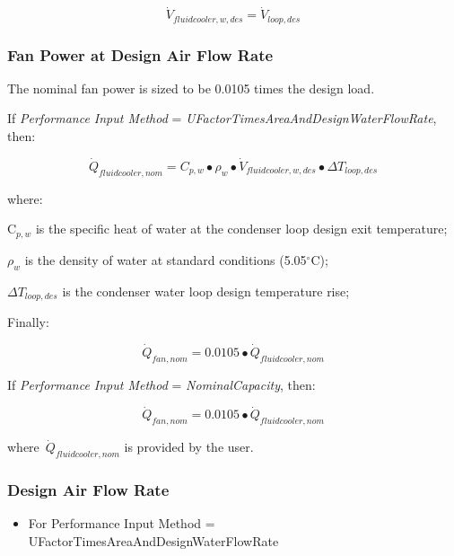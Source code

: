 \begin{equation}
{\dot V_{fluidcooler,w,des}} = {\dot V_{loop,des}}
\end{equation}

\subsubsection{Fan Power at Design Air Flow Rate}\label{fan-power-at-design-air-flow-rate-1}

The nominal fan power is sized to be 0.0105 times the design load.

If \emph{Performance Input Method} = \emph{UFactorTimesAreaAndDesignWaterFlowRate}, then:

\begin{equation}
{\dot Q_{fluidcooler,nom}} = {C_{p,w}} \bullet {\rho_w} \bullet {\dot V_{fluidcooler,w,des}} \bullet \Delta {T_{loop,des}}
\end{equation}

where:

C\(_{p,w}\) is the specific heat of water at the condenser loop design exit temperature;

\emph{\(\rho_{w}\)} is the density of water at standard conditions (5.05\(^{\circ}\)C);

\emph{\(\Delta T_{loop,des}\)} is the condenser water loop design temperature rise;

Finally:

\begin{equation}
{\dot Q_{fan,nom}} = 0.0105 \bullet {\dot Q_{fluidcooler,nom}}
\end{equation}

If \emph{Performance Input Method} = \emph{NominalCapacity}, then:

\begin{equation}
  {\dot Q_{fan,nom}} = 0.0105 \bullet {\dot Q_{fluidcooler,nom}}
\end{equation}

where~\({\dot Q_{fluidcooler,nom}}\) is provided by the user.

\subsubsection{Design Air Flow Rate}\label{design-air-flow-rate-1}

\begin{itemize}
\tightlist
\item
  For Performance Input Method = UFactorTimesAreaAndDesignWaterFlowRate
\end{itemize}

